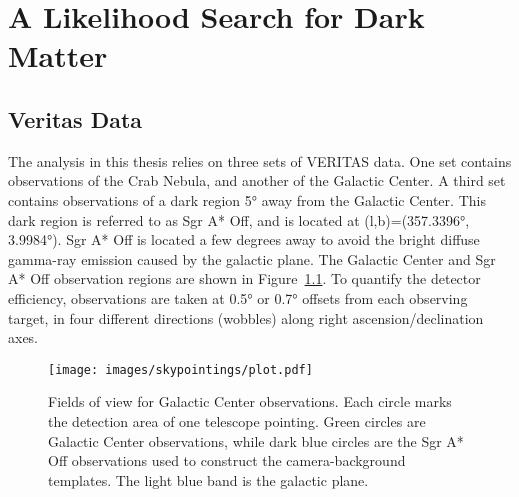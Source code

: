 \cleartooddpage[\thispagestyle{empty}]
\newcommand{\Like}{L}
\newcommand{\LogLike}{\mathcal{L}}
\newcommand{\LogLikeMax}{\LogLike_{\textrm{max}}}
\newcommand{\xtrue}{\mathbf{x }}
\newcommand{\xdet }{\mathbf{x'}}
\newcommand{\ltrue}{\mathbf{l }}
\newcommand{\ldet }{\mathbf{l'}}
\newcommand{\btrue}{\mathbf{b }}
\newcommand{\bdet }{\mathbf{b'}}
\newcommand{\Etrue}{\mathbf{E }}
\newcommand{\Edet }{\mathbf{E'}}
\newcommand{\ttrue}{\mathbf{t }}
\newcommand{\tdet }{\mathbf{t'}}
\newcommand{\Aeff }{A_\textrm{eff }}
\newcommand{\Edisp}{E_\textrm{disp}}
\newcommand{\Mnull}{M_\textrm{null}}
\newcommand{\Malt }{M_\textrm{alt }}

\chapter{A Likelihood Search for Dark Matter}\label{chapter:analysis}

\section{Veritas Data}\label{veritasdata}
  The analysis in this thesis relies on three sets of VERITAS data.
  One set contains observations of the Crab Nebula, and another of the Galactic Center.
  A third set contains observations of a dark region \nicetilde\ang{5} away from the Galactic Center.
  This dark region is referred to as  Sgr A* Off, and is located at (l,b)=(\ang{357.3396}, \ang{3.9984}).
  Sgr A* Off is located a few degrees away to avoid the bright diffuse gamma-ray emission caused by the galactic plane.
  The Galactic Center and Sgr A* Off observation regions are shown in Figure~\ref{fig:gcfieldsofview}.
  To quantify the detector efficiency, observations are taken at \ang{0.5} or \ang{0.7} offsets from each observing target, in four different directions (wobbles) along right ascension/declination axes.

  \begin{figure}[ht]
    \centering
    \texttt{[image: images/skypointings/plot.pdf]}
    \caption[VERITAS Galactic Center Pointings]{
      Fields of view for Galactic Center observations.
      Each circle marks the detection area of one telescope pointing.
      Green circles are Galactic Center observations, while dark blue circles are the Sgr A* Off observations used to construct the camera-background templates.
      The light blue band is the galactic plane.
    }
    \label{fig:gcfieldsofview}
  \end{figure}

